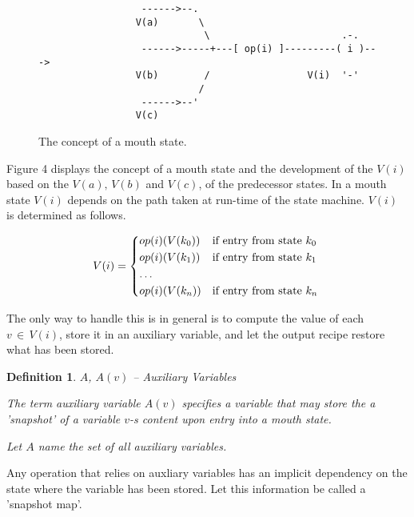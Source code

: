 \documentclass[12pt,a4paper]{scrartcl}
\newtheorem{definition}{Definition}
\begin{document}
\begin{figure}[htbp] \leavevmode
\begin{verbatim}
                  ------>--.  
                 V(a)       \ 
                             \                       .-.
                  ------>-----+---[ op(i) ]---------( i )---> 
                 V(b)        /                 V(i)  '-'
                            /
                  ------>--'
                 V(c)

\end{verbatim}
\caption{The concept of a mouth state.}
\end{figure}

Figure 4 displays the concept of a mouth state and the development of the
$V(i)$ based on the $V(a),\,V(b)$ and $V(c)$, of the predecessor states. In
a mouth state $V(i)$ depends on the path taken at run-time of the state machine.
$V(i)$ is determined as follows.

\begin{equation} \label{eq:interference}
    V(i) = \begin{dcases*}
            op(i)(V(k_0)) & if entry from state $k_0$ \\
            op(i)(V(k_1)) & if entry from state $k_1$ \\
            \ldots \\
            op(i)(V(k_n)) & if entry from state $k_n$ \\
            \end{dcases*}
\end{equation}

The only way to handle this is in general is to compute the value of each $v\,\in\,V(i)$,
store it in an auxiliary variable, and let the output recipe restore what
has been stored.

\begin{definition}
$A$, $A(v)$ -- Auxiliary Variables

The term auxiliary variable $A(v)$ specifies a variable that may store the
a 'snapshot' of a variable $v$-s content upon entry into a mouth state. 
   
Let $A$ name the set of all auxiliary variables.
\end{definition}

Any operation that relies on auxliary variables has an implicit dependency
on the state where the variable has been stored. Let this information be
called a 'snapshot map'.
\end{document}
